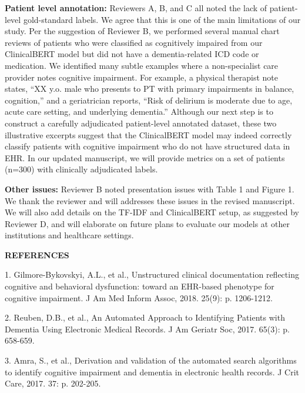 \documentclass{article}
\begin{document}
\textbf{Patient level annotation:} Reviewers A, B, and C all noted the lack of patient-level gold-standard labels. We agree that this is one of the main limitations of our study. Per the suggestion of Reviewer B, we performed several manual chart reviews of patients who were classified as cognitively impaired from our ClinicalBERT model but did not have a dementia-related ICD code or medication. We identified many subtle examples where a non-specialist care provider notes cognitive impairment. For example, a physical therapist note states, “XX y.o. male who presents to PT with primary impairments in balance, cognition,” and a geriatrician reports, “Risk of delirium is moderate due to age, acute care setting, and underlying dementia.” Although our next step is to construct a carefully adjudicated patient-level annotated dataset, these two illustrative excerpts suggest that the ClinicalBERT model may indeed correctly classify patients with cognitive impairment who do not have structured data in EHR. In our updated manuscript, we will provide metrics on a set of patients (n=300) with clinically adjudicated labels.

\textbf{Other issues:} Reviewer B noted presentation issues with Table 1 and Figure 1. We thank the reviewer and will addresses these issues in the revised manuscript. We will also add details on the TF-IDF and ClinicalBERT setup, as suggested by Reviewer D, and will elaborate on future plans to evaluate our models at other institutions and healthcare settings.

\textbf{REFERENCES}

1.	Gilmore-Bykovskyi, A.L., et al., Unstructured clinical documentation reflecting cognitive and behavioral dysfunction: toward an EHR-based phenotype for cognitive impairment. J Am Med Inform Assoc, 2018. 25(9): p. 1206-1212.

2.	Reuben, D.B., et al., An Automated Approach to Identifying Patients with Dementia Using Electronic Medical Records. J Am Geriatr Soc, 2017. 65(3): p. 658-659.

3.	Amra, S., et al., Derivation and validation of the automated search algorithms to identify cognitive impairment and dementia in electronic health records. J Crit Care, 2017. 37: p. 202-205.
\end{document}

